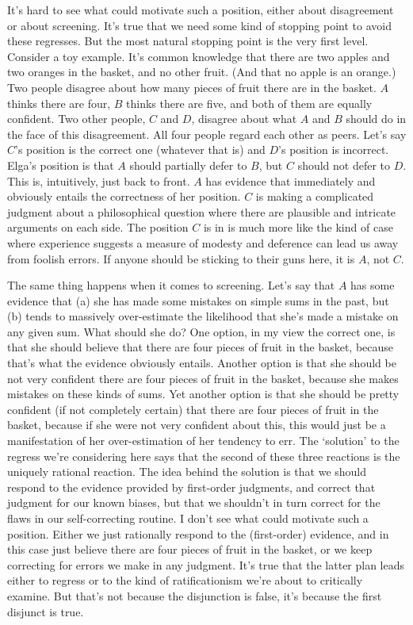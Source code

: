 It's hard to see what could motivate such a position, either about disagreement or about screening. It's true that we need some kind of stopping point to avoid these regresses. But the most natural stopping point is the very first level. Consider a toy example. It's common knowledge that there are two apples and two oranges in the basket, and no other fruit. (And that no apple is an orange.) Two people disagree about how many pieces of fruit there are in the basket. \(A\) thinks there are four, \(B\) thinks there are five, and both of them are equally confident. Two other people, \(C\) and \(D\), disagree about what \(A\) and \(B\) should do in the face of this disagreement. All four people regard each other as peers. Let's say \(C\)'s position is the correct one (whatever that is) and \(D\)'s position is incorrect. Elga's position is that \(A\) should partially defer to \(B\), but \(C\) should not defer to \(D\). This is, intuitively, just back to front. \(A\) has evidence that immediately and obviously entails the correctness of her position. \(C\) is making a complicated judgment about a philosophical question where there are plausible and intricate arguments on each side. The position \(C\) is in is much more like the kind of case where experience suggests a measure of modesty and deference can lead us away from foolish errors. If anyone should be sticking to their guns here, it is \(A\), not \(C\).

The same thing happens when it comes to screening. Let's say that \(A\) has some evidence that (a) she has made some mistakes on simple sums in the past, but (b) tends to massively over-estimate the likelihood that she's made a mistake on any given sum. What should she do? One option, in my view the correct one, is that she should believe that there are four pieces of fruit in the basket, because that's what the evidence obviously entails. Another option is that she should be not very confident there are four pieces of fruit in the basket, because she makes mistakes on these kinds of sums. Yet another option is that she should be pretty confident (if not completely certain) that there are four pieces of fruit in the basket, because if she were not very confident about this, this would just be a manifestation of her over-estimation of her tendency to err. The `solution' to the regress we're considering here says that the second of these three reactions is the uniquely rational reaction. The idea behind the solution is that we should respond to the evidence provided by first-order judgments, and correct that judgment for our known biases, but that we shouldn't in turn correct for the flaws in our self-correcting routine. I don't see what could motivate such a position. Either we just rationally respond to the (first-order) evidence, and in this case just believe there are four pieces of fruit in the basket, or we keep correcting for errors we make in any judgment. It's true that the latter plan leads either to regress or to the kind of ratificationism we're about to critically examine. But that's not because the disjunction is false, it's because the first disjunct is true.

